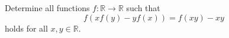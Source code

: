Determine all functions $f: \mathbb{R} \to \mathbb{R}$ such that
$$f(xf(y) - y f(x)) = f(xy) - xy$$
holds for all $x, y \in \mathbb{R}$.
